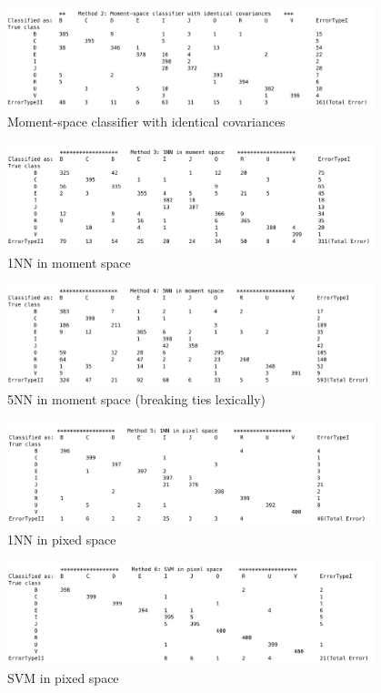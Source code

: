 \documentclass[12pt,letterpaper]{article}
\begin{document}
\begin{figure}[H]
\centering
\includegraphics[width=0.95\textwidth]{2}
\caption{Moment-space classifier with identical covariances}
\end{figure}

\begin{figure}[H]
\centering
\includegraphics[width=0.95\textwidth]{3}
\caption{1NN in moment space}
\end{figure}

\begin{figure}[H]
\centering
\includegraphics[width=0.95\textwidth]{4}
\caption{5NN in moment space (breaking ties lexically)}
\end{figure}

\begin{figure}[H]
\centering
\includegraphics[width=0.95\textwidth]{5}
\caption{1NN in pixed space}
\end{figure}

\begin{figure}[H]
\centering
\includegraphics[width=0.95\textwidth]{6}
\caption{SVM in pixed space}
\end{figure}
\end{document}
